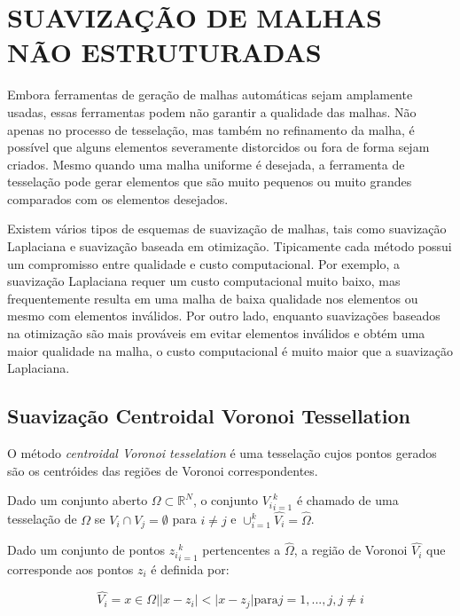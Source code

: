 \chapter[SUAVIZAÇÃO DE MALHAS NÃO ESTRUTURADAS]{SUAVIZAÇÃO DE MALHAS NÃO ESTRUTURADAS}

Embora ferramentas de geração de malhas automáticas sejam amplamente usadas, essas ferramentas podem não garantir a qualidade das malhas. Não apenas no processo de tesselação, mas também no refinamento da malha, é possível que alguns elementos severamente distorcidos ou fora de forma sejam criados. Mesmo quando uma malha uniforme é desejada, a ferramenta de tesselação pode gerar elementos que são muito pequenos ou muito grandes comparados com os elementos desejados. \cite{Zhou}

Existem vários tipos de esquemas de suavização de malhas, tais como suavização Laplaciana e suavização baseada em otimização. Tipicamente cada método possui um compromisso entre qualidade e custo computacional. Por exemplo, a suavização Laplaciana requer um custo computacional muito baixo, mas frequentemente resulta em uma malha de baixa qualidade nos elementos ou mesmo com elementos inválidos. Por outro lado, enquanto suavizações baseados na otimização são mais prováveis em evitar elementos inválidos e obtém uma maior qualidade na malha, o custo computacional é muito maior que a suavização Laplaciana. \cite{Zhou}

\section{Suavização Centroidal Voronoi Tessellation}

O método \textit{centroidal Voronoi tesselation} é uma tesselação cujos pontos gerados são os centróides das regiões de Voronoi correspondentes. \cite{Du1999}

Dado um conjunto aberto $\Omega \subset \mathbb{R}^N$, o conjunto ${V_i}_{i=1}^k$ é chamado de uma tesselação de $\Omega$ se $V_i \cap V_j = \emptyset$ para $i \neq j$ e $\cup_{i=1}^k \hat{V_i} = \hat{\Omega}$.

Dado um conjunto de pontos ${z_i}_{i=1}^k$ pertencentes a $\hat{\Omega}$, a região de Voronoi $\hat{V_i}$ que corresponde aos pontos $z_i$ é definida por:

\begin{equation}
    \hat{V_i} = {x \in \Omega |  |x-z_i| < |x-z_j| \text{para} j=1,...,j, j \neq i }
\end{equation}


